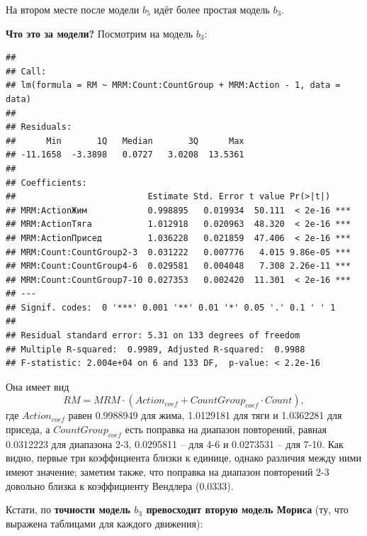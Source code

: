 \documentclass[
]{article}
\begin{document}
На втором месте после модели \(b_5\) идёт более простая модель \(b_3\).

\textbf{Что это за модели?} Посмотрим на модель \(b_3\):

\begin{verbatim}
## 
## Call:
## lm(formula = RM ~ MRM:Count:CountGroup + MRM:Action - 1, data = data)
## 
## Residuals:
##      Min       1Q   Median       3Q      Max 
## -11.1658  -3.3898   0.0727   3.0208  13.5361 
## 
## Coefficients:
##                          Estimate Std. Error t value Pr(>|t|)    
## MRM:ActionЖим            0.998895   0.019934  50.111  < 2e-16 ***
## MRM:ActionТяга           1.012918   0.020963  48.320  < 2e-16 ***
## MRM:ActionПрисед         1.036228   0.021859  47.406  < 2e-16 ***
## MRM:Count:CountGroup2-3  0.031222   0.007776   4.015 9.86e-05 ***
## MRM:Count:CountGroup4-6  0.029581   0.004048   7.308 2.26e-11 ***
## MRM:Count:CountGroup7-10 0.027353   0.002420  11.301  < 2e-16 ***
## ---
## Signif. codes:  0 '***' 0.001 '**' 0.01 '*' 0.05 '.' 0.1 ' ' 1
## 
## Residual standard error: 5.31 on 133 degrees of freedom
## Multiple R-squared:  0.9989, Adjusted R-squared:  0.9988 
## F-statistic: 2.004e+04 on 6 and 133 DF,  p-value: < 2.2e-16
\end{verbatim}

Она имеет вид
\[RM=MRM \cdot (Action_{coef}+CountGroup_{coef} \cdot Count),\] где
\(Action_{coef}\) равен 0.9988949 для жима, 1.0129181 для тяги и
1.0362281 для приседа, а \(CountGroup_{coef}\) есть поправка на диапазон
повторений, равная 0.0312223 для диапазона 2-3, 0.0295811 -- для 4-6 и
0.0273531 -- для 7-10. Как видно, первые три коэффициента близки к
единице, однако различия между ними имеют значение; заметим также, что
поправка на диапазон повторений 2-3 довольно близка к коэффициенту
Вендлера (0.0333).

Кстати, по \textbf{точности модель \(b_3\) превосходит вторую модель
Мориса} (ту, что выражена таблицами для каждого движения):
\end{document}
